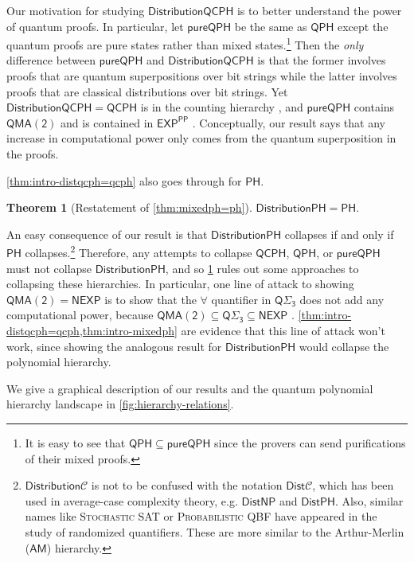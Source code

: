 \documentclass[11pt]{article}
\newtheorem{theorem}{Theorem}[section]
\theoremstyle{definition}
\newcommand{\class}[1]{\ensuremath{\mathsf{#1}}\xspace}
\newcommand{\EXP}{\class{EXP}}
\newcommand{\NEXP}{\class{NEXP}}
\newcommand{\QMAk}[1][k]{\class{QMA(#1)}}
\newcommand{\QMAtwo}{\QMAk[2]}
\newcommand{\PP}{\class{PP}}
\newcommand{\PH}{\class{PH}}
\newcommand{\QCPH}{\class{QCPH}}
\newcommand{\QPH}{\class{QPH}}
\newcommand{\QSigmai}[1][i]{\class{Q\Sigma_{#1}}}
\newcommand{\pureQPH}{\class{pureQPH}}
\newcommand{\distributionPH}{\mixedPH}
\newcommand{\distributionQCPH}{\mathsf{DistributionQCPH}}
\newcommand{\mixedPH}{\class{DistributionPH}}
\newcommand{\prob}[1]{\textsc{#1}}
\newcommand{\calC}{\mathcal{C}}
\newcommand{\eg}{e.g.\xspace}
\begin{document}
Our motivation for studying $\distributionQCPH$ is to better understand the power of quantum proofs. 
In particular, let $\pureQPH$ be the same as $\QPH$ except the quantum proofs are pure states rather than mixed states.\footnote{It is easy to see that $\QPH \subseteq \pureQPH$ since the provers can send purifications of their mixed proofs.\label{footnote:pureQPH}} 
Then the \emph{only} difference between $\pureQPH$ and $\distributionQCPH$ is that the former involves proofs that are quantum superpositions over bit strings while the latter involves proofs that are classical distributions over bit strings. 
Yet $\distributionQCPH = \QCPH$ is in the counting hierarchy \cite{GSSSY22_qph}, and $\pureQPH$ contains $\QMAtwo$ and is contained in $\EXP^\PP$ \cite{agarwal2023quantum}. Conceptually, our result says that any increase in computational power only comes from the quantum superposition in the proofs.

\cref{thm:intro-distqcph=qcph} also goes through for $\PH$. 

\begin{theorem}[Restatement of \cref{thm:mixedph=ph}]\label{thm:intro-mixedph}
   $\distributionPH = \PH.$
\end{theorem}

An easy consequence of our result is that $\distributionPH$ collapses if and only if $\PH$ collapses.\footnote{$\class{Distribution}\calC$ is not to be confused with the notation $\class{Dist}\calC$, which has been used in average-case complexity theory, \eg{} $\class{DistNP}$ and $\class{DistPH}$.
Also, similar names like \prob{Stochastic SAT} or \prob{Probabilistic QBF} have appeared in the study of randomized quantifiers. These are more similar to the Arthur-Merlin ($\class{AM}$) hierarchy. 
}
Therefore, any attempts to collapse $\QCPH$, $\QPH$, or $\pureQPH$ must not collapse $\distributionPH$, and so \cref{thm:intro-mixedph} rules out some approaches to collapsing these hierarchies.
In particular, one line of attack to showing $\QMAtwo = \NEXP$ is to show that the $\forall$ quantifier in $\QSigmai[3]$ does not add any computational power, because $\QMAtwo \subseteq \QSigmai[3] \subseteq \NEXP$ \cite{GSSSY22_qph}. \cref{thm:intro-distqcph=qcph,thm:intro-mixedph} are evidence that this line of attack won't work, since showing the analogous result for $\distributionPH$ would collapse the polynomial hierarchy. 


We give a graphical description of our results and the quantum polynomial hierarchy landscape in \cref{fig:hierarchy-relations}.
\end{document}
